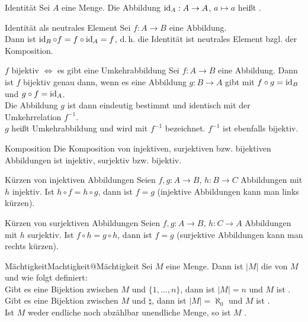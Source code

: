 \begin{Def}{Identität}
    Sei $A$ eine Menge.
    Die Abbildung $\operatorname{id}_A: A \rightarrow A$, $a \mapsto a$ heißt
    .
\end{Def}

\begin{Lemma}{Identität als neutrales Element}
    Sei $f: A \rightarrow B$ eine Abbildung. \\
    Dann ist $\operatorname{id}_B \circ f = f \circ \operatorname{id}_A = f$, d.\,h. die Identität ist
    neutrales Element bzgl. der Komposition.
\end{Lemma}

\begin{Satz}{$f$ bijektiv $\Leftrightarrow$ es gibt eine Umkehrabbildung}
    Sei $f: A \rightarrow B$ eine Abbildung.
    Dann ist $f$ bijektiv genau dann, wenn es eine Abbildung
    $g: B \rightarrow A$ gibt mit $f \circ g = \operatorname{id}_B$ und
    $g \circ f = \operatorname{id}_A$. \\
    Die Abbildung $g$ ist dann eindeutig bestimmt und identisch mit der
    Umkehrrelation $f^{-1}$. \\
    $g$ heißt Umkehrabbildung und wird mit $f^{-1}$ bezeichnet.
    $f^{-1}$ ist ebenfalls bijektiv.
\end{Satz}

\begin{Satz}{Komposition}
    Die Komposition von injektiven, surjektiven bzw. bijektiven Abbildungen
    ist injektiv, surjektiv bzw. bijektiv.
\end{Satz}

\begin{Satz}{Kürzen von injektiven Abbildungen}
    Seien $f, g: A \rightarrow B$, $h: B \rightarrow C$ Abbildungen
    mit $h$ injektiv.
    Ist $h \circ f = h \circ g$, dann ist $f = g$ (injektive Abbildungen kann
    man links kürzen).
\end{Satz}

\begin{Satz}{Kürzen von surjektiven Abbildungen}
    Seien $f, g: A \rightarrow B$, $h: C \rightarrow A$ Abbildungen
    mit $h$ surjektiv.
    Ist $f \circ h = g \circ h$, dann ist $f = g$ (surjektive Abbildungen kann
    man rechts kürzen).
\end{Satz}

\begin{xDef}{Mächtigkeit}{Machtigkeit@Mächtigkeit}
    Sei $M$ eine Menge.
    Dann ist $|M|$ die 
    von $M$ und wie folgt definiert: \\
    Gibt es eine Bijektion zwischen $M$ und
    $\{1, \ldots, n\}$, dann ist $|M| = n$ und $M$ ist
    . \\
    Gibt es eine Bijektion zwischen $M$ und $\natural$, dann ist
    $|M| = \aleph_0$ und $M$ ist
    . \\
    Ist $M$ weder endliche noch abzählbar unendliche Menge, so ist
    $M$ .
\end{xDef}

